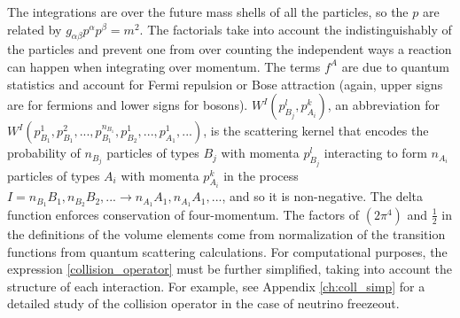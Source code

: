   The integrations are over the future mass shells of all the particles, so the $p$ are related by $g_{\alpha \beta}p^\alpha p^\beta=m^2$. The factorials take into account the indistinguishably of the particles and prevent one from over counting the independent ways a reaction can happen when integrating over momentum.  The terms $f^A$ are due to quantum statistics and account for Fermi repulsion or Bose attraction (again, upper signs are for fermions and lower signs for bosons).  $W^I(p_{B_j}^l,p_{A_i}^k)$, an abbreviation for  $W^I(p_{B_1}^1,p_{B_1}^2,...,p_{B_1}^{n_{B_1}},p_{B_2}^1,...,p_{A_1}^1,...)$, is the scattering kernel that encodes the probability of $n_{B_j}$ particles of types $B_j$ with momenta $p_{B_j}^l$ interacting to form $n_{A_i}$ particles of types $A_i$ with momenta $p_{A_i}^k$ in the process $I=n_{B_1}B_1,n_{B_2}B_2,...\longrightarrow n_{A_1}A_1,n_{A_1}A_1,...$, and so it is non-negative.  The delta function enforces conservation of four-momentum. The factors of $(2\pi^4)$ and $\frac{1}{2}$ in the definitions of the volume elements come from normalization of the transition functions from quantum scattering calculations.  For computational purposes, the expression \eqref{collision_operator} must be further simplified, taking into account the structure of each interaction.  For example, see Appendix \ref{ch:coll_simp} for a detailed study of the collision operator in the case of neutrino freezeout.

